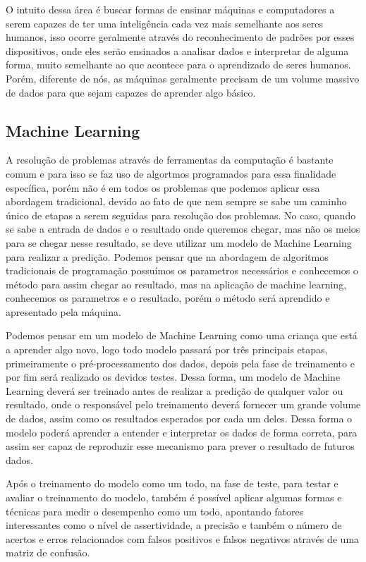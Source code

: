 O intuito dessa área é buscar formas de ensinar máquinas e computadores a serem capazes de ter uma inteligência cada vez mais semelhante aos seres humanos, isso ocorre geralmente através do reconhecimento de padrões por esses dispositivos, onde eles serão ensinados a analisar dados e interpretar de alguma forma, muito semelhante ao que acontece para o aprendizado de seres humanos. Porém, diferente de nós, as máquinas geralmente precisam de um volume massivo de dados para que sejam capazes de aprender algo básico.

\subsection{Machine Learning}
A resolução de problemas através de ferramentas da computação é bastante comum e para isso se faz uso de algortmos programados para essa finalidade específica, porém não é em todos os problemas que podemos aplicar essa abordagem tradicional, devido ao fato de que nem sempre se sabe um caminho único de etapas a serem seguidas para resolução dos problemas. No caso, quando se sabe a entrada de dados e o resultado onde queremos chegar, mas não os meios para se chegar nesse resultado, se deve utilizar um modelo de Machine Learning para realizar a predição. Podemos pensar que na abordagem de algoritmos tradicionais de programação possuímos os parametros necessários e conhecemos o método para assim chegar ao resultado, mas na aplicação de machine learning, conhecemos os parametros e o resultado, porém o método será aprendido e apresentado pela máquina. %

Podemos pensar em um modelo de Machine Learning como uma criança que está a aprender algo novo, logo todo modelo passará por três principais etapas, primeiramente o pré-processamento dos dados, depois pela fase de treinamento e por fim será realizado os devidos testes. Dessa forma, um modelo de Machine Learning deverá ser treinado antes de realizar a predição de qualquer valor ou resultado, onde o responsável pelo treinamento deverá fornecer um grande volume de dados, assim como os resultados esperados por cada um deles. Dessa forma o modelo poderá aprender a entender e interpretar os dados de forma correta, para assim ser capaz de reproduzir esse mecanismo para prever o resultado de futuros dados.

Após o treinamento do modelo como um todo, na fase de teste, para testar e avaliar o treinamento do modelo, também é possível aplicar algumas formas e técnicas para medir o desempenho como um todo, apontando fatores interessantes como o nível de assertividade, a precisão e também o número de acertos e erros relacionados com falsos positivos e falsos negativos através de uma matriz de confusão.

